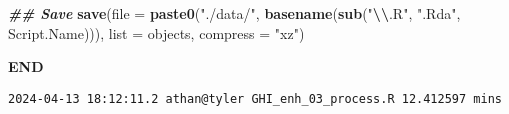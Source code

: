 \documentclass[
  10pt,
  a4paper,oneside]{article}
\newenvironment{Shaded}{\begin{snugshade}}{\end{snugshade}}
\newcommand{\AttributeTok}[1]{\textcolor[rgb]{0.13,0.29,0.53}{#1}}
\newcommand{\DocumentationTok}[1]{\textcolor[rgb]{0.56,0.35,0.01}{\textbf{\textit{#1}}}}
\newcommand{\FunctionTok}[1]{\textcolor[rgb]{0.13,0.29,0.53}{\textbf{#1}}}
\newcommand{\NormalTok}[1]{#1}
\newcommand{\SpecialCharTok}[1]{\textcolor[rgb]{0.81,0.36,0.00}{\textbf{#1}}}
\newcommand{\StringTok}[1]{\textcolor[rgb]{0.31,0.60,0.02}{#1}}
\begin{document}
\begin{Shaded}
\begin{Highlighting}[]
\DocumentationTok{\#\# Save}
\FunctionTok{save}\NormalTok{(}\AttributeTok{file =} \FunctionTok{paste0}\NormalTok{(}\StringTok{"./data/"}\NormalTok{, }\FunctionTok{basename}\NormalTok{(}\FunctionTok{sub}\NormalTok{(}\StringTok{"}\SpecialCharTok{\textbackslash{}\textbackslash{}}\StringTok{.R"}\NormalTok{, }\StringTok{".Rda"}\NormalTok{, Script.Name))),}
     \AttributeTok{list =}\NormalTok{ objects,}
     \AttributeTok{compress =} \StringTok{"xz"}\NormalTok{)}
\end{Highlighting}
\end{Shaded}

\textbf{END}

\begin{verbatim}
2024-04-13 18:12:11.2 athan@tyler GHI_enh_03_process.R 12.412597 mins
\end{verbatim}
\end{document}
